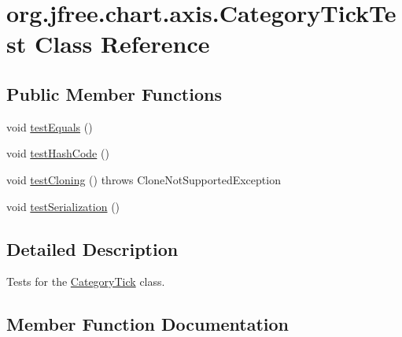 \hypertarget{classorg_1_1jfree_1_1chart_1_1axis_1_1_category_tick_test}{}\section{org.\+jfree.\+chart.\+axis.\+Category\+Tick\+Test Class Reference}
\label{classorg_1_1jfree_1_1chart_1_1axis_1_1_category_tick_test}
\subsection*{Public Member Functions}
\begin{DoxyCompactItemize}
\item 
void \mbox{\hyperlink{classorg_1_1jfree_1_1chart_1_1axis_1_1_category_tick_test_a2524506e3b421c975d6af6563a48b60d}{test\+Equals}} ()
\item 
void \mbox{\hyperlink{classorg_1_1jfree_1_1chart_1_1axis_1_1_category_tick_test_a004470d9a141199a8e846feae28609a6}{test\+Hash\+Code}} ()
\item 
void \mbox{\hyperlink{classorg_1_1jfree_1_1chart_1_1axis_1_1_category_tick_test_ac8ef61d4f77a0cc20b50bb9796a34224}{test\+Cloning}} ()  throws Clone\+Not\+Supported\+Exception 
\item 
void \mbox{\hyperlink{classorg_1_1jfree_1_1chart_1_1axis_1_1_category_tick_test_a0ea103ccfd7313f029ef8e702150eb44}{test\+Serialization}} ()
\end{DoxyCompactItemize}


\subsection{Detailed Description}
Tests for the \mbox{\hyperlink{classorg_1_1jfree_1_1chart_1_1axis_1_1_category_tick}{Category\+Tick}} class. 

\subsection{Member Function Documentation}
\mbox{\label{classorg_1_1jfree_1_1chart_1_1axis_1_1_category_tick_test_ac8ef61d4f77a0cc20b50bb9796a34224}} 
